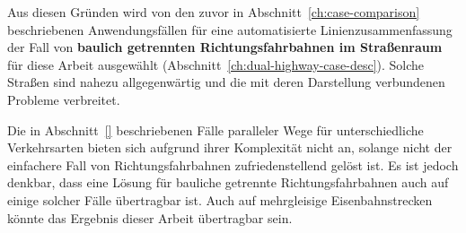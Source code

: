 \documentclass[../main/thesis.tex]{subfiles}
\begin{document}
Aus diesen Gründen wird von den zuvor in Abschnitt~\ref{ch:case-comparison} beschriebenen Anwendungsfällen für eine automatisierte Linienzusammenfassung der Fall von \textbf{baulich getrennten Richtungsfahrbahnen im Straßenraum} für diese Arbeit ausgewählt (Abschnitt~\ref{ch:dual-highway-case-desc}).
Solche Straßen sind nahezu allgegenwärtig und die mit deren Darstellung verbundenen Probleme verbreitet.

Die in Abschnitt~\ref{} beschriebenen Fälle paralleler Wege für unterschiedliche Verkehrsarten bieten sich aufgrund ihrer Komplexität nicht an, solange nicht der einfachere Fall von Richtungsfahrbahnen zufriedenstellend gelöst ist.
Es ist jedoch denkbar, dass eine Lösung für bauliche getrennte Richtungsfahrbahnen auch auf einige solcher Fälle übertragbar ist.
Auch auf mehrgleisige Eisenbahnstrecken könnte das Ergebnis dieser Arbeit übertragbar sein.



\onlyinsubfile{}
\end{document}
